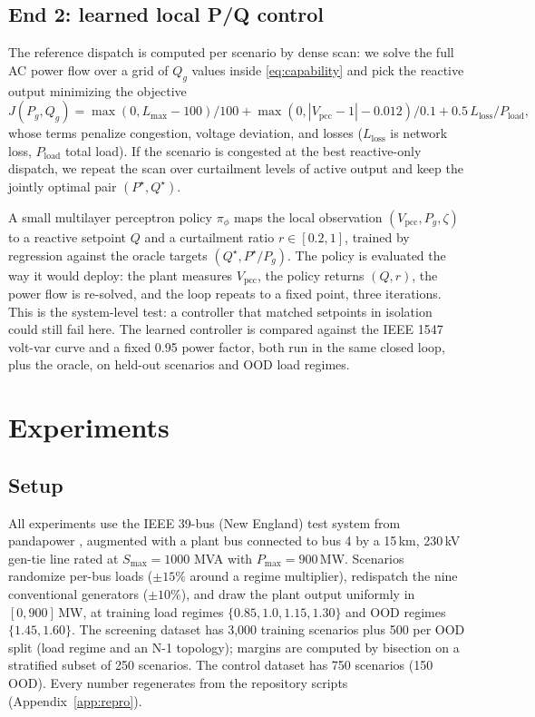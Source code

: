 \documentclass{article}
\newcommand{\pcc}{\mathrm{pcc}}
\newcommand{\zt}{\zeta}
\newcommand{\citep}[1]{\cite{#1}}
\begin{document}
\subsection{End 2: learned local P/Q control}
The reference dispatch is computed per scenario by dense scan: we solve the
full AC power flow over a grid of $Q_g$ values inside \eqref{eq:capability}
and pick the reactive output minimizing the objective
\begin{equation}
  J(P_g,Q_g) = \max(0,L_{\max}-100)/100
  + \max(0,|V_{\pcc}-1|-0.012)/0.1
  + 0.5\,L_{\mathrm{loss}}/P_{\mathrm{load}},
  \label{eq:obj}
\end{equation}
whose terms penalize congestion, voltage deviation, and losses
($L_{\mathrm{loss}}$ is network loss, $P_{\mathrm{load}}$ total load). If the scenario is congested at the best reactive-only dispatch, we
repeat the scan over curtailment levels of active output and keep the
jointly optimal pair $(P^\star,Q^\star)$.

A small multilayer perceptron policy $\pi_\phi$ maps the local observation
$(V_{\pcc},P_g,\zt)$ to a reactive setpoint $Q$ and a curtailment ratio
$r\in[0.2,1]$, trained by regression against the oracle targets
$(Q^\star,P^\star/P_g)$. The policy is evaluated the way it would deploy:
the plant measures $V_{\pcc}$, the policy returns $(Q,r)$, the power flow is
re-solved, and the loop repeats to a fixed point, three iterations. This is
the system-level test: a controller that matched setpoints in isolation
could still fail here. The learned controller is compared against the IEEE
1547 volt-var curve and a fixed 0.95 power factor, both run in the same
closed loop, plus the oracle, on held-out scenarios and OOD load regimes.

\section{Experiments}

\subsection{Setup}
\label{sec:setup}
All experiments use the IEEE 39-bus (New England) test system
\citep{athay1979practical} from pandapower \citep{thurner2018pandapower},
augmented with a plant bus connected to bus 4 by a 15\,km, 230\,kV gen-tie
line rated at $S_{\max}=1000$ MVA with $P_{\max}=900$\,MW. Scenarios
randomize per-bus loads ($\pm15\%$ around a regime multiplier), redispatch
the nine conventional generators ($\pm10\%$), and draw the plant output
uniformly in $[0,900]$\,MW, at training load regimes
$\{0.85,1.0,1.15,1.30\}$ and OOD regimes $\{1.45,1.60\}$. The screening
dataset has 3{,}000 training scenarios plus 500 per OOD split (load regime
and an N-1 topology); margins are computed by bisection on a stratified
subset of 250 scenarios. The control dataset has 750 scenarios (150 OOD).
Every number regenerates from the repository scripts
(Appendix~\ref{app:repro}).
\end{document}
